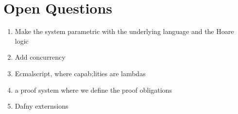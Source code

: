 \section{Open Questions}

\begin{enumerate}
\item
Make the system parametric with the underlying language and the Hoare logic
\item
Add concurrency
\item
Ecmalscript, where capab;lities are lambdas
\item
a proof system where we define the proof obligations
\item
Dafny externsions
\end{enumerate}